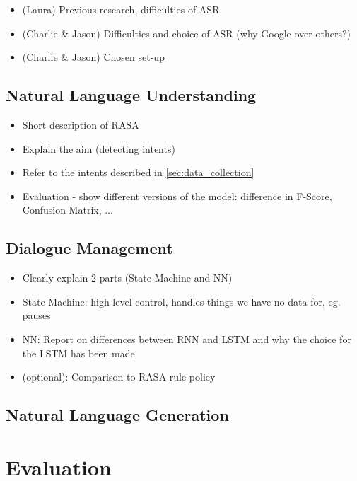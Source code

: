 \documentclass[hidelinks, 11pt]{article}
\begin{document}
\begin{itemize}
  \item (Laura) Previous research, difficulties of ASR
  \item (Charlie \& Jason) Difficulties and choice of ASR (why Google over others?)
  \item (Charlie \& Jason) Chosen set-up
\end{itemize}

\subsection{Natural Language Understanding}
\label{subsec:nlu}

\begin{itemize}
  \item Short description of RASA
  \item Explain the aim (detecting intents)
  \item Refer to the intents described in \ref{sec:data_collection} 
  \item Evaluation - show different versions of the model: difference in F-Score, Confusion Matrix, ...
\end{itemize}

\subsection{Dialogue Management}
\label{subsec:dialogue_management}

\begin{itemize}
  \item Clearly explain 2 parts (State-Machine and NN)
  \item State-Machine: high-level control, handles things we have no data for, eg. pauses
  \item NN: Report on differences between RNN and LSTM and why the choice for the LSTM has been made
  \item (optional): Comparison to RASA rule-policy
\end{itemize}

\subsection{Natural Language Generation}
\label{subsec:nlg}


\section{Evaluation}
\label{sec:evaluation}
\end{document}
